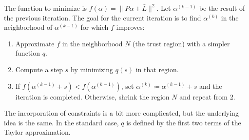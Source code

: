 The function to minimize is $f(\alpha) = \lVert P \alpha + \bar{L} \rVert^2$.
Let $\alpha^{(k - 1)}$ be the result of the previous iteration.
The goal for the current iteration is to find $\alpha^{(k)}$ in the neighborhood of $\alpha^{(k - 1)}$ for which $f$ improves:
\begin{enumerate}
	\item 	Approximate $f$ in the neighborhood $N$ (the trust region) with a simpler function $q$.
	\item 	Compute a step $s$ by minimizing $q(s)$ in that region.
	\item 	If $f(\alpha^{(k - 1)} + s) < f(\alpha^{(k - 1)})$, set $\alpha^{(k)} \coloneqq \alpha^{(k - 1)} + s$ and the iteration is completed.
	Otherwise, shrink the region $N$ and repeat from 2.
\end{enumerate}
The incorporation of constraints is a bit more complicated, but the underlying idea is the same.
In the standard case, $q$ is defined by the first two terms of the Taylor approximation.
